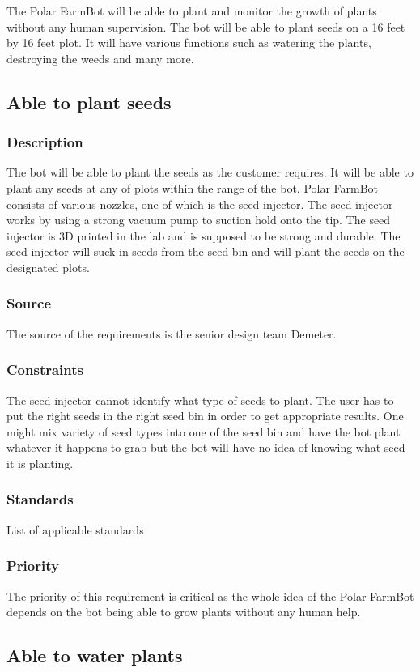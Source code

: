 The Polar FarmBot will be able to plant and monitor the growth of plants without any human supervision. The bot will be able to plant seeds on a 16 feet by 16 feet plot. It will have various functions such as watering the plants, destroying the weeds and many more.

\subsection{Able to plant seeds }
\subsubsection{Description}
The bot will be able to plant the seeds as the customer requires. It will be able to plant any seeds at any of plots within the range of the bot. Polar FarmBot consists of various nozzles, one of which is the seed injector. The seed injector works by using a strong vacuum pump to suction hold onto the tip. The seed injector is 3D printed in the lab and is supposed to be strong and durable. The seed injector will suck in seeds from the seed bin and will plant the seeds on the designated plots.
\subsubsection{Source}
The source of the requirements is the senior design team Demeter.
\subsubsection{Constraints}
The seed injector cannot identify what type of seeds to plant. The user has to put the right seeds in the right seed bin in order to get appropriate results. One might mix variety of seed types into one of the seed bin and have the bot plant whatever it happens to grab but the bot will have no idea of knowing what seed it is planting.
\subsubsection{Standards}
List of applicable standards
\subsubsection{Priority}
The priority of this requirement is critical as the whole idea of the Polar FarmBot depends on the bot being able to grow plants without any human help.

\subsection{Able to water plants}
